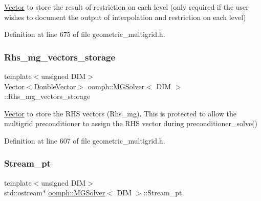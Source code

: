 \hyperlink{classoomph_1_1Vector}{Vector} to store the result of restriction on each level (only required if the user wishes to document the output of interpolation and restriction on each level) 



Definition at line 675 of file geometric\+\_\+multigrid.\+h.

\mbox{\label{classoomph_1_1MGSolver_a18889939fb1256a86e5862c1e5ecbd31}} 
\subsubsection{\texorpdfstring{Rhs\+\_\+mg\+\_\+vectors\+\_\+storage}{Rhs\_mg\_vectors\_storage}}
{\footnotesize\ttfamily template$<$unsigned D\+IM$>$ \\
\hyperlink{classoomph_1_1Vector}{Vector}$<$\hyperlink{classoomph_1_1DoubleVector}{Double\+Vector}$>$ \hyperlink{classoomph_1_1MGSolver}{oomph\+::\+M\+G\+Solver}$<$ D\+IM $>$\+::Rhs\+\_\+mg\+\_\+vectors\+\_\+storage\hspace{0.3cm}{\ttfamily [protected]}}



\hyperlink{classoomph_1_1Vector}{Vector} to store the R\+HS vectors (Rhs\+\_\+mg). This is protected to allow the multigrid preconditioner to assign the R\+HS vector during preconditioner\+\_\+solve() 



Definition at line 607 of file geometric\+\_\+multigrid.\+h.

\mbox{\label{classoomph_1_1MGSolver_a5184053b6d2a717a6d6865c76acef14b}} 
\subsubsection{\texorpdfstring{Stream\+\_\+pt}{Stream\_pt}}
{\footnotesize\ttfamily template$<$unsigned D\+IM$>$ \\
std\+::ostream$\ast$ \hyperlink{classoomph_1_1MGSolver}{oomph\+::\+M\+G\+Solver}$<$ D\+IM $>$\+::Stream\+\_\+pt\hspace{0.3cm}{\ttfamily [protected]}}




